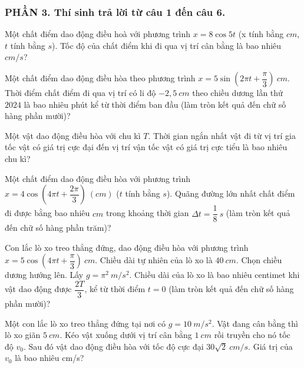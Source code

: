 \subsubsection*{PHẦN 3. Thí sinh trả lời từ câu 1 đến câu 6.}
\setcounter{ex}{0}
\begin{ex}
	Một chất điểm dao động điều hoà với phương trình $x=8 \cos 5 t$ (x tính bằng $cm$, $t$ tính bằng $s$). Tốc độ của chất điểm khi đi qua vị trí cân bằng là bao nhiêu $cm/s$?
\end{ex}
\begin{ex}
	Một chất điểm dao động điều hòa theo phương trình $x=5 \sin \left(2 \pi t+\dfrac{\pi}{3}\right)\ cm$. Thời điểm chất điểm đi qua vị trí có li độ $-2,5 \ cm$ theo chiều dương lần thứ $2024$ là bao nhiêu phút kể từ thời điểm ban đầu (làm tròn kết quả đến chữ số hàng phần mười)?
	 
	
\end{ex}
\begin{ex}
	Một vật dao động điều hòa với chu kì $T$. Thời gian ngắn nhất vật đi từ vị trí gia tốc vật có giá trị cực đại đến vị trí vận tốc vật có giá trị cực tiểu là bao nhiêu chu kì?
	
\end{ex}
\begin{ex}
	Một chất điểm dao động điều hòa với phương trình $x=4 \cos \left(4 \pi t+\dfrac{2 \pi}{3}\right)\ (cm)$ ($t$ tính bằng $s$). Quãng đường lớn nhất chất điểm đi được bằng bao nhiêu $cm$ trong khoảng thời gian $\Delta t=\dfrac{1}{8} \ s$ (làm tròn kết quả đến chữ số hàng phần trăm)?
\end{ex}
\begin{ex}
	Con lắc lò xo treo thẳng đứng, dao động điều hòa với phương trình $x=5 \cos \left(4 \pi t+\dfrac{\pi}{3}\right)\ cm$. Chiều dài tự nhiên của lò xo là $40 \ cm$. Chọn chiều dương hướng lên. Lấy $g=\pi^2 \ m/s^2$. Chiều dài của lò xo là bao nhiêu  centimet khi vật dao động được $\dfrac{2T}{3}$, kể từ thời điểm $t=0$ (làm tròn kết quả đến chữ số hàng phần mười)?
\end{ex}
\begin{ex}%
	Một con lắc lò xo treo thẳng đứng tại nơi có $g = 10\ m/s^2$. Vật đang cân bằng thì lò xo giãn $5\ cm$. Kéo vật xuống dưới vị trí cân bằng $1\ cm$ rồi truyền cho nó tốc độ $v_0$. Sau đó vật dao động điều hòa với tốc độ cực đại $30\sqrt{2}\ cm/s$. Giá trị của $v_0$ là bao nhiêu cm/s?
	
\end{ex}
